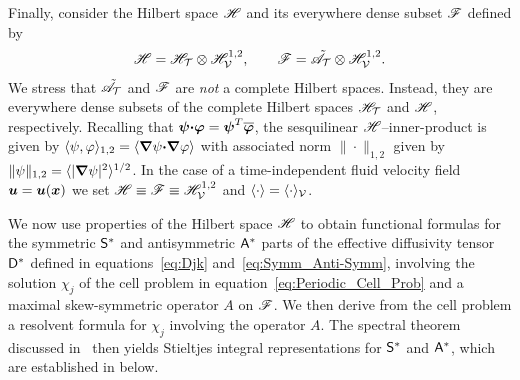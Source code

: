 \documentclass[amsa]{ipart}
\begin{document}
Finally, consider the Hilbert
space $\mathscr{H}$ and its everywhere dense subset $\mathscr{F}$ defined by
%
\begin{align}\label{eq:Function_Space_Scalar}
  \Hs=\Hs_{\Tc}\otimes\Hs^{1,2}_{\Vc}, \qquad
  \Fs=\tilde{\As}_{\Tc}\otimes\Hs^{1,2}_{\Vc}.
\end{align}
%
We stress that $\tilde{\mathscr{A}}_{\mathcal{T}}$ and $\mathscr{F}$ are \emph{not} a
complete Hilbert spaces. Instead, they are everywhere dense subsets of
the complete Hilbert spaces $\mathscr{H}_{\mathcal{T}}$ and $\mathscr{H}$, respectively.
Recalling that $\boldsymbol{\psi}\mbox{\boldmath${\cdot}$}\boldsymbol{\varphi}=\boldsymbol{\psi}^T\overline{\boldsymbol{\varphi}}$,
the sesquilinear  
$\mathscr{H}$--inner-product is given by $\langle\psi,\varphi\rangle_{1,2}=\left\langle\mbox{\boldmath${\nabla}$} \psi\mbox{\boldmath${\cdot}$}\mbox{\boldmath${\nabla}$} \varphi \right\rangle$ with associated norm
$\|\cdot\|_{1,2}$ given by $\|\psi\|_{1,2}= \langle|\mbox{\boldmath${\nabla}$} \psi|^2\rangle^{1/2}$.
In the case of a 
time-independent fluid velocity field $\boldsymbol{u}=\boldsymbol{u}(\boldsymbol{x})$ we set 
$\mathscr{H}\equiv\mathscr{F}\equiv\mathscr{H}^{1,2}_{\mathcal{V}}$ and $\langle\cdot\rangle=\langle\cdot\rangle_{\mathcal{V}}$.  





We now use properties of the Hilbert space $\mathscr{H}$ to obtain
functional formulas for the symmetric $\mathsf{S}^*$ and antisymmetric
$\mathsf{A}^*$ parts of the effective diffusivity tensor $\mathsf{D}^*$ defined in
equations~\eqref{eq:Djk} and~\eqref{eq:Symm_Anti-Symm}, involving the
solution $\chi_j$ of the cell problem in
equation~\eqref{eq:Periodic_Cell_Prob} and a maximal skew-symmetric
operator $A$ on $\mathscr{F}$. We then derive from the cell 
problem a resolvent formula for $\chi_j$ involving the operator
$A$. The spectral theorem discussed in~
then yields Stieltjes integral representations for
$\mathsf{S}^*$ and $\mathsf{A}^*$, which are established in
 below. 
\end{document}
